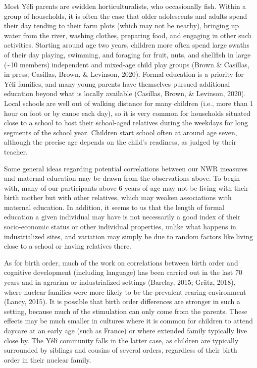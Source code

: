 \documentclass[
  american,
  ,man,floatsintext]{apa6}
\begin{document}
Most Yélî parents are swidden horticulturalists, who occasionally fish. Within a group of households, it is often the case that older adolescents and adults spend their day tending to their farm plots (which may not be nearby), bringing up water from the river, washing clothes, preparing food, and engaging in other such activities. Starting around age two years, children more often spend large swaths of their day playing, swimming, and foraging for fruit, nuts, and shellfish in large (\textasciitilde10 members) independent and mixed-age child play groups (Brown \& Casillas, in press; Casillas, Brown, \& Levinson, 2020). Formal education is a priority for Yélî families, and many young parents have themselves pursued additional education beyond what is locally available (Casillas, Brown, \& Levinson, 2020). Local schools are well out of walking distance for many children (i.e., more than 1 hour on foot or by canoe each day), so it is very common for households situated close to a school to host their school-aged relatives during the weekdays for long segments of the school year. Children start school often at around age seven, although the precise age depends on the child's readiness, as judged by their teacher.

Some general ideas regarding potential correlations between our NWR measures and maternal education may be drawn from the observations above. To begin with, many of our participants above 6 years of age may not be living with their birth mother but with other relatives, which may weaken associations with maternal education.
In addition, it seems to us that the length of formal education a given individual may have is not necessarily a good index of their socio-economic status or other individual properties, unlike what happens in industrialized sites, and variation may simply be due to random factors like living close to a school or having relatives there.

As for birth order, much of the work on correlations between birth order and cognitive development (including language) has been carried out in the last 70 years and in agrarian or industrialized settings (Barclay, 2015; Grätz, 2018), where nuclear families were more likely to be the prevalent rearing environment (Lancy, 2015). It is possible that birth order differences are stronger in such a setting, because much of the stimulation can only come from the parents. These effects may be much smaller in cultures where it is common for children to attend daycare at an early age (such as France) or where extended family typically live close by. The Yélî community falls in the latter case, as children are typically surrounded by siblings and cousins of several orders, regardless of their birth order in their nuclear family.
\end{document}
